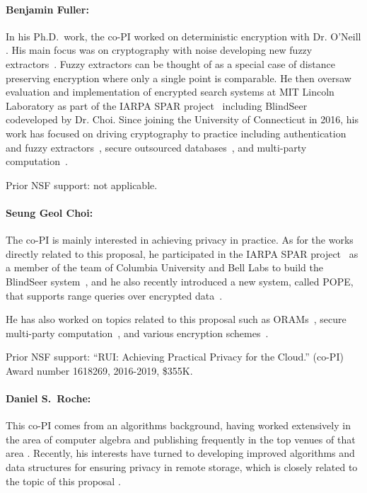 \documentclass[11pt]{article}
\theoremstyle{remark}
\begin{document}
\paragraph{Benjamin Fuller:}
In his Ph.D.~work, the co-PI worked on deterministic encryption with Dr. O'Neill \cite{TCC:FulNeiRey12,JC:FulONeRey15}.  His main focus was on cryptography with noise developing new fuzzy extractors~\cite{AC:FulMenRey13,AC:FulReySmi16,EC:CFPRS16}.  Fuzzy extractors can be thought of as a special case of distance preserving encryption where only a single point is comparable.  He then oversaw evaluation and implementation of encrypted search systems at MIT Lincoln Laboratory as part of the IARPA SPAR project~\cite{spar_baa} including BlindSeer codeveloped by Dr. Choi.  Since joining the University of Connecticut in 2016, his work has focused on driving cryptography to practice including authentication and fuzzy extractors~\cite{EPRINT:HFDD17,EPRINT:BKFY17,EPRINT:ABCFG16}, secure outsourced databases~\cite{SP:FVYSHG17}, and multi-party computation~\cite{EPRINT:CunFulYak16}.  

Prior NSF support: not applicable.

\paragraph{Seung Geol Choi:}
The co-PI is mainly interested in achieving privacy in practice. As for the
works directly related to this proposal, he participated in the IARPA SPAR
project~\cite{spar_baa} as a member of the team of Columbia University and Bell
Labs to build the BlindSeer system~\cite{SP:PKVKMC14}, and he also recently
introduced a new system, called POPE, that supports range queries over
encrypted data~\cite{CCS:RACY16}.  

He has also worked on topics related to this proposal such as
ORAMs~\cite{SP:RocAviCho16,NDSS:ACMR17,CCS:RACM17}, secure multi-party
computation~\cite{AC:CEJMY07,TCC:CDMW09,AC:CEMY09,RSA:CHKMR12,TCC:CKKZ12,PKC:CKWZ13,C:CKMZ14,TCC:CKSYZ14},
and various encryption schemes~\cite{TCC:CDMW08,AC:CDMW09,AC:LCLPY13}. 

Prior NSF support: ``RUI: Achieving Practical Privacy for the Cloud.'' (co-PI) Award number 1618269, 2016-2019, \$355K. 

\paragraph{Daniel S.\ Roche:}
This co-PI comes from an algorithms background, having worked
extensively in the area of computer algebra and publishing frequently in
the top venues of that area
\cite{Roc09,Roc11,GR10,GR11,GR11a,GRT10,GRT12,HR10,AGR14,AR14,AGR15}. Recently, his interests have turned to
developing improved algorithms and data structures for ensuring privacy
in remote storage, which is closely related to the topic of this
proposal
\cite{SP:RocAviCho16,CCS:RACY16,NDSS:ACMR17,CCS:RACM17}.
\end{document}
